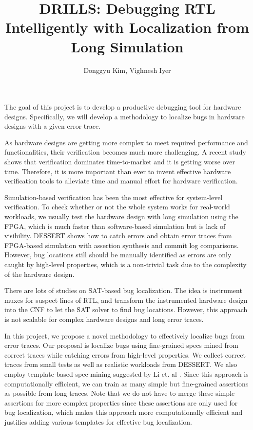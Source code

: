 \documentclass[11pt]{article}
\title{DRILLS: Debugging RTL Intelligently with Localization from Long Simulation}
\author{Donggyu Kim, Vighnesh Iyer}
\date{}
\begin{document}
\maketitle

The goal of this project is to develop a productive debugging tool for hardware designs. Specifically, we will develop a methodology to localize bugs in hardware designs with a given error trace.

As hardware designs are getting more complex to meet required performance and functionalities, their verification becomes much more challenging. A recent study shows that verification dominates time-to-market and it is getting worse over time\autocite{Foster}. Therefore, it is more important than ever to invent effective hardware verification tools to alleviate time and manual effort for hardware verification.

Simulation-based verification has been the most effective for system-level verification. To check whether or not the whole system works for real-world workloads, we usually test the hardware design with long simulation using the FPGA, which is much faster than software-based simulation but is lack of visibility. DESSERT\autocite{Kim2018} shows how to catch errors and obtain error traces from FPGA-based simulation with assertion synthesis and commit log comparisons. However, bug locations still should be manually identified as errors are only caught by high-level properties, which is a non-trivial task due to the complexity of the hardware design.

There are lots of studies on SAT-based bug localization\autocite{Veneris2003, Chang2007, Mirzaeian}. The idea is instrument muxes for suspect lines of RTL, and transform the instrumented hardware design into the CNF to let the SAT solver to find bug locations. However, this approach is not scalable for complex hardware designs and long error traces.

In this project, we propose a novel methodology to effectively localize bugs from error traces. Our proposal is localize bugs using fine-grained specs mined from correct traces while catching errors from high-level properties. We collect correct traces from small tests as well as realistic workloads from DESSERT. We also employ template-based spec-mining suggested by Li et. al \autocite{Li2010}. Since this approach is computationally efficient, we can train as many simple but fine-grained assertions as possible from long traces. Note that we do not have to merge these simple assertions for more complex properties since these assertions are only used for bug localization, which makes this approach more computationally efficient and justifies adding various templates for effective bug localization.
\end{document}

